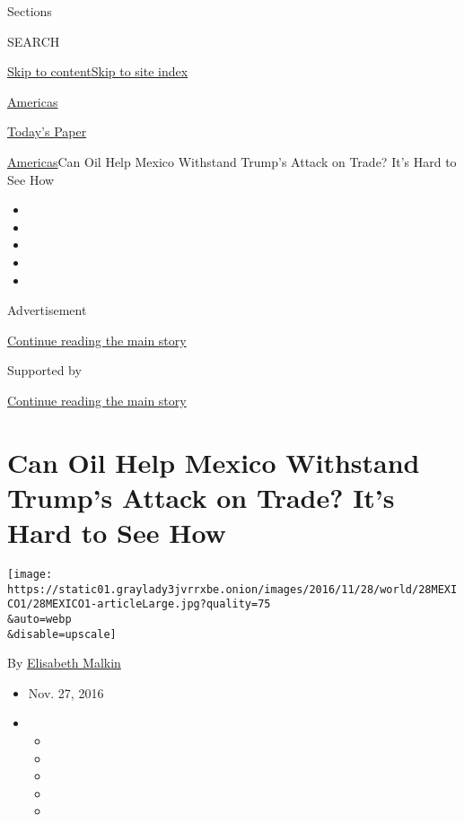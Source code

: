 Sections

SEARCH

\protect\hyperlink{site-content}{Skip to
content}\protect\hyperlink{site-index}{Skip to site index}

\href{https://www.nytimes3xbfgragh.onion/section/world/americas}{Americas}

\href{https://myaccount.nytimes3xbfgragh.onion/auth/login?response_type=cookie\&client_id=vi}{}

\href{https://www.nytimes3xbfgragh.onion/section/todayspaper}{Today's
Paper}

\href{/section/world/americas}{Americas}\textbar{}Can Oil Help Mexico
Withstand Trump's Attack on Trade? It's Hard to See How

\begin{itemize}
\item
\item
\item
\item
\item
\end{itemize}

Advertisement

\protect\hyperlink{after-top}{Continue reading the main story}

Supported by

\protect\hyperlink{after-sponsor}{Continue reading the main story}

\hypertarget{can-oil-help-mexico-withstand-trumps-attack-on-trade-its-hard-to-see-how}{%
\section{Can Oil Help Mexico Withstand Trump's Attack on Trade? It's
Hard to See
How}\label{can-oil-help-mexico-withstand-trumps-attack-on-trade-its-hard-to-see-how}}

\texttt{[image: https://static01.graylady3jvrrxbe.onion/images/2016/11/28/world/28MEXICO1/28MEXICO1-articleLarge.jpg?quality=75\\\&auto=webp\\\&disable=upscale]}

By
\href{https://www.nytimes3xbfgragh.onion/by/elisabeth-malkin}{Elisabeth
Malkin}

\begin{itemize}
\item
  Nov. 27, 2016
\item
  \begin{itemize}
  \item
  \item
  \item
  \item
  \item
  \end{itemize}
\end{itemize}


